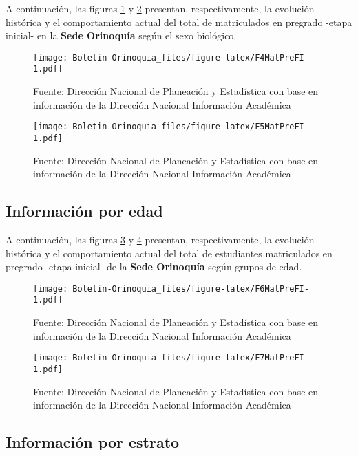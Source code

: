 \documentclass[
]{book}
\begin{document}
A continuación, las figuras \ref{fig:F4MatPreFI} y \ref{fig:F5MatPreFI} presentan, respectivamente, la evolución histórica y el comportamiento actual del total de matriculados en pregrado -etapa inicial- en la \textbf{Sede Orinoquía} según el sexo biológico.

\begin{figure}
\centering
\texttt{[image: Boletin-Orinoquia\_files/figure-latex/F4MatPreFI-1.pdf]}
\caption{\label{fig:F4MatPreFI}Fuente: Dirección Nacional de Planeación y Estadística con base en información de la Dirección Nacional Información Académica}
\end{figure}

\begin{figure}
\centering
\texttt{[image: Boletin-Orinoquia\_files/figure-latex/F5MatPreFI-1.pdf]}
\caption{\label{fig:F5MatPreFI}Fuente: Dirección Nacional de Planeación y Estadística con base en información de la Dirección Nacional Información Académica}
\end{figure}

\hypertarget{informaciuxf3n-por-edad-3}{%
\subsection{Información por edad}\label{informaciuxf3n-por-edad-3}}

A continuación, las figuras \ref{fig:F6MatPreFI} y \ref{fig:F7MatPreFI} presentan, respectivamente, la evolución histórica y el comportamiento actual del total de estudiantes matriculados en pregrado -etapa inicial- de la \textbf{Sede Orinoquía} según grupos de edad.

\begin{figure}
\centering
\texttt{[image: Boletin-Orinoquia\_files/figure-latex/F6MatPreFI-1.pdf]}
\caption{\label{fig:F6MatPreFI}Fuente: Dirección Nacional de Planeación y Estadística con base en información de la Dirección Nacional Información Académica}
\end{figure}

\begin{figure}
\centering
\texttt{[image: Boletin-Orinoquia\_files/figure-latex/F7MatPreFI-1.pdf]}
\caption{\label{fig:F7MatPreFI}Fuente: Dirección Nacional de Planeación y Estadística con base en información de la Dirección Nacional Información Académica}
\end{figure}

\hypertarget{informaciuxf3n-por-estrato-1}{%
\subsection{Información por estrato}\label{informaciuxf3n-por-estrato-1}}
\end{document}
